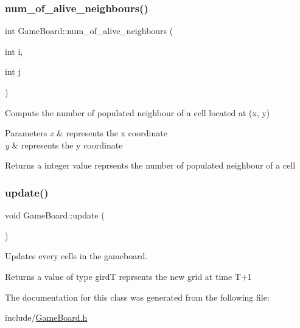 \subsubsection{\texorpdfstring{num\_of\_alive\_neighbours()}{num\_of\_alive\_neighbours()}}
{\footnotesize\ttfamily int Game\+Board\+::num\+\_\+of\+\_\+alive\+\_\+neighbours (\begin{DoxyParamCaption}\item[{int}]{i,  }\item[{int}]{j }\end{DoxyParamCaption})}



Compute the number of populated neighbour of a cell located at (x, y) 


\begin{DoxyParams}{Parameters}
{\em x} & represents the x coordinate \\
\hline
{\em y} & represents the y coordinate \\
\hline
\end{DoxyParams}
\begin{DoxyReturn}{Returns}
a integer value reprsents the number of populated neighbour of a cell 
\end{DoxyReturn}
\mbox{\label{class_game_board_a5dc2bdedeaa9d70bb4a1c35a5a257d91}} 
\subsubsection{\texorpdfstring{update()}{update()}}
{\footnotesize\ttfamily void Game\+Board\+::update (\begin{DoxyParamCaption}{ }\end{DoxyParamCaption})}



Updates every cells in the gameboard. 

\begin{DoxyReturn}{Returns}
a value of type girdT reprsents the new grid at time T+1 
\end{DoxyReturn}


The documentation for this class was generated from the following file\+:\begin{DoxyCompactItemize}
\item 
include/\mbox{\hyperlink{_game_board_8h}{Game\+Board.\+h}}\end{DoxyCompactItemize}
